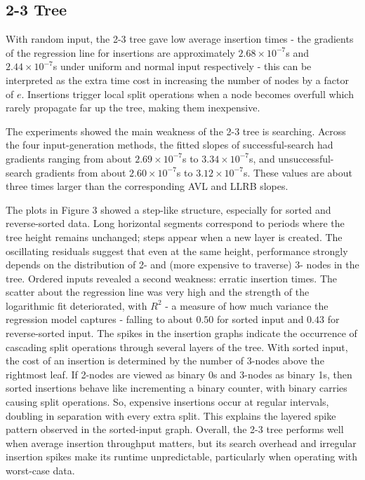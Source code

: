 \documentclass[12pt]{article}
\begin{document}
\subsection{2-3 Tree}
With random input, the 2-3 tree gave low average insertion times - the gradients of the regression line for insertions are approximately $2.68\times 10^{-7}$s and $2.44 \times 10^{-7}$s under uniform and normal input respectively - this can be interpreted as the extra time cost in increasing the number of nodes by a factor of $e$. Insertions trigger local split operations when a node becomes overfull which rarely propagate far up the tree, making them inexpensive.

The experiments showed the main weakness of the 2-3 tree is searching. Across the four input-generation methods, the fitted slopes of successful-search had gradients ranging from about $2.69 \times 10^{-7}$s to $3.34 \times 10^{-7}$s, and unsuccessful-search gradients from about $2.60 \times 10^{-7}$s to $3.12 \times 10^{-7}$s. These values are about three times larger than the corresponding AVL and LLRB slopes. 

The plots in Figure 3 showed a step-like structure, especially for sorted and reverse-sorted data. Long horizontal segments correspond to periods where the tree height remains unchanged; steps appear when a new layer is created. The oscillating residuals suggest that even at the same height, performance strongly depends on the distribution of 2- and (more expensive to traverse) 3- nodes in the tree.
Ordered inputs revealed a second weakness: erratic insertion times. The scatter about the regression line was very high and the strength of the logarithmic fit deteriorated, with $R^2$ - a measure of how much variance the regression model captures - falling to about $0.50$ for sorted input and $0.43$ for reverse-sorted input. 
The spikes in the insertion graphs indicate the occurrence of cascading split operations through several layers of the tree. With sorted input, the cost of an insertion is determined by the number of 3-nodes above the rightmost leaf. If 2-nodes are viewed as binary 0s and 3-nodes as binary 1s, then sorted insertions behave like incrementing a binary counter, with binary carries causing split operations. So, expensive insertions occur at regular intervals, doubling in separation with every extra split. This explains the layered spike pattern observed in the sorted-input graph.
Overall, the 2-3 tree performs well when  average insertion throughput matters, but its search overhead and irregular insertion spikes make its runtime unpredictable, particularly when operating with worst-case data.
\end{document}
